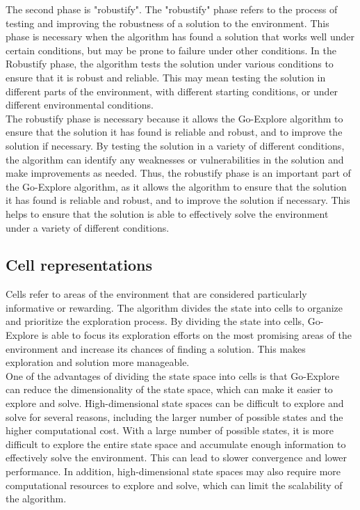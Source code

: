\documentclass[runningheads]{llncs}%
\begin{document}
The second phase is "robustify". The "robustify" phase refers to the process of testing and improving the robustness of a solution to the environment. This phase is necessary when the algorithm has found a solution that works well under certain conditions, but may be prone to failure under other conditions. In the Robustify phase, the algorithm tests the solution under various conditions to ensure that it is robust and reliable. This may mean testing the solution in different parts of the environment, with different starting conditions, or under different environmental conditions.\\
The robustify phase is necessary because it allows the Go-Explore algorithm to ensure that the solution it has found is reliable and robust, and to improve the solution if necessary. By testing the solution in a variety of different conditions, the algorithm can identify any weaknesses or vulnerabilities in the solution and make improvements as needed. Thus,  the robustify phase is an important part of the Go-Explore algorithm, as it allows the algorithm to ensure that the solution it has found is reliable and robust, and to improve the solution if necessary. This helps to ensure that the solution is able to effectively solve the environment under a variety of different conditions.

\subsection{Cell representations }
Cells refer to areas of the environment that are considered particularly informative or rewarding. The algorithm divides the state into cells to organize and prioritize the exploration process. By dividing the state into cells, Go-Explore is able to focus its exploration efforts on the most promising areas of the environment and increase its chances of finding a solution. This makes exploration and solution more manageable.\\

One of the advantages of dividing the state space into cells is that Go-Explore can reduce the dimensionality of the state space, which can make it easier to explore and solve. High-dimensional state spaces can be difficult to explore and solve for several reasons, including the larger number of possible states and the higher computational cost. With a large number of possible states, it is more difficult to explore the entire state space and accumulate enough information to effectively solve the environment. This can lead to slower convergence and lower performance. In addition, high-dimensional state spaces may also require more computational resources to explore and solve, which can limit the scalability of the algorithm.\\
\end{document}
